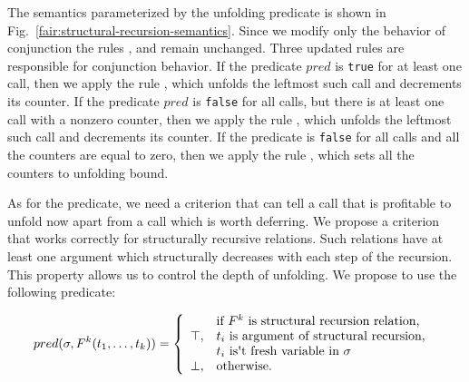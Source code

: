 The semantics parameterized by the unfolding predicate is shown in Fig.~\ref{fair:structural-recursion-semantics}. Since we modify only the behavior of conjunction the rules ,
 and  remain unchanged. Three updated rules are responsible for conjunction behavior. If the predicate $pred$ is \lstinline{true} for at least one call, then we
apply the rule , which unfolds the leftmost such call and decrements its counter. If the predicate $pred$ is \lstinline{false} for all calls, but there is at least one
call with a nonzero counter, then we apply the rule , which unfolds the leftmost such call and decrements its counter. If the predicate is \lstinline{false} for all calls
and all the counters are equal to zero, then we apply the rule , which sets all the counters to unfolding bound.

As for the predicate, we need a criterion that can tell a call that is profitable to unfold now apart from a call which is worth deferring. We propose a criterion that works correctly
for structurally recursive relations. Such relations have at least one argument which structurally decreases with each step of the recursion. This property allows us to control the depth
of unfolding. We propose to use the following predicate:

\[
pred(\sigma, F^k(t_1, \ldots, t_k)) = \left\{
\begin{array}{cl}
      & \mbox{if } F^k \mbox{ is structural recursion relation, } \\
\top, & t_i \mbox { is argument of structural recursion, } \\
      & t_i \mbox { is\textquotesingle t fresh variable in } \sigma \\
\bot, & \mbox{otherwise.}
\end{array}
\right.
\]

